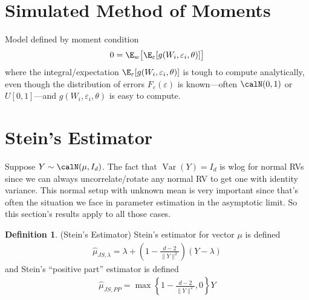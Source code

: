 \documentclass[12pt]{article}
\theoremstyle{plain}
\theoremstyle{definition}
\newtheorem{defn}[thm]{Definition}
\theoremstyle{remark}
\newcommand{\Var}{\operatorname{Var}}
\begin{document}
\clearpage
\section{Simulated Method of Moments}

Model defined by moment condition
\begin{align*}
  0 = \E_w\big[\E_\varepsilon[g(W_i,\varepsilon_i,\theta)]\big]
\end{align*}
where the integral/expectation
$\E_\varepsilon[g(W_i,\varepsilon_i,\theta)]$ is tough to compute
analytically, even though the distribution of errors
$F_\varepsilon(\varepsilon)$ is known---often $\calN(0,1)$ or
$U[0,1]$---and $g(W_i,\varepsilon_i,\theta)$ is easy to compute.


\clearpage
\section{Stein's Estimator}

Suppose $Y \sim \calN(\mu,I_d)$.
The fact that $\Var(Y)=I_d$ is wlog for normal RVs since we can always
uncorrelate/rotate any normal RV to get one with identity variance.
This normal setup with unknown mean is very important since that's often
the situation we face in parameter estimation in the asymptotic limit.
So this section's results apply to all those cases.

\begin{defn}(Stein's Estimator)
Stein's estimator for vector $\mu$ is defined
\begin{align*}
  \hat{\mu}_{JS,\lambda}
  =
  \lambda
  +
  \left(
  1-
  \frac{d-2}{\lVert Y\rVert^2}
  \right)
  (Y-\lambda)
\end{align*}
and Stein's ``positive part'' estimator is defined
\begin{align*}
  \hat{\mu}_{JS,PP}
  =
  \max
  \left\{
  1-
  \frac{d-2}{\lVert Y\rVert^2}
  ,0
  \right\}
  Y
\end{align*}
\end{defn}
\end{document}
